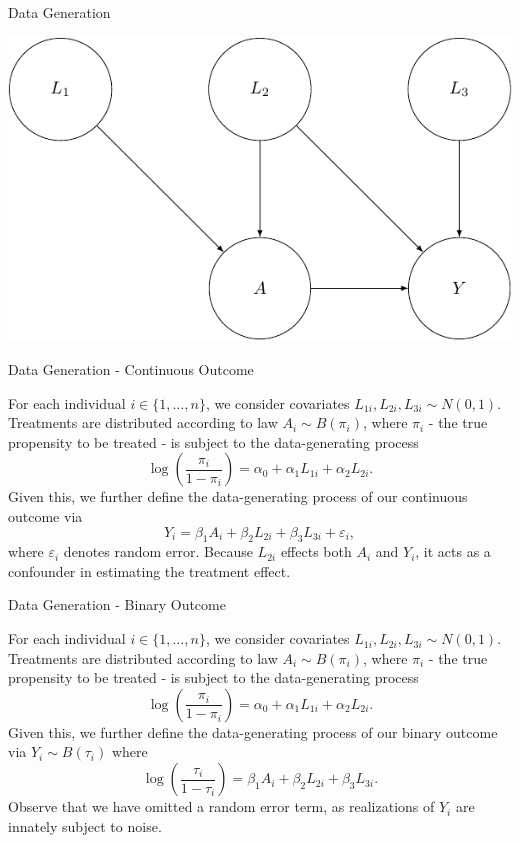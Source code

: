 \documentclass[
  ignorenonframetext,
]{beamer}
\begin{document}
\begin{frame}{Data Generation}
\protect\hypertarget{data-generation}{}

\includegraphics{pres_draft_jimmy_files/figure-beamer/unnamed-chunk-3-1.pdf}

\end{frame}

\begin{frame}{Data Generation - Continuous Outcome}
\protect\hypertarget{data-generation---continuous-outcome}{}

For each individual \(i \in \{ 1, \ldots, n \}\), we consider covariates
\(L_{1i}, L_{2i}, L_{3i} \sim N(0, 1)\). Treatments are distributed
according to law \(A_i \sim B(\pi_i)\), where \(\pi_i\) - the true
propensity to be treated - is subject to the data-generating process \[
    \log \left( \frac{\pi_i}{1 - \pi_i} \right)
    = \alpha_0 + \alpha_1 L_{1i} + \alpha_2 L_{2i}.
  \] Given this, we further define the data-generating process of our
continuous outcome via
\[ Y_i = \beta_1 A_i + \beta_2 L_{2i} + \beta_3 L_{3i} + \varepsilon_i, \]
where \(\varepsilon_i\) denotes random error. Because \(L_{2i}\) effects
both \(A_i\) and \(Y_i\), it acts as a confounder in estimating the
treatment effect.

\end{frame}

\begin{frame}{Data Generation - Binary Outcome}
\protect\hypertarget{data-generation---binary-outcome}{}

For each individual \(i \in \{ 1, \ldots, n \}\), we consider covariates
\(L_{1i}, L_{2i}, L_{3i} \sim N(0, 1)\). Treatments are distributed
according to law \(A_i \sim B(\pi_i)\), where \(\pi_i\) - the true
propensity to be treated - is subject to the data-generating process \[
    \log \left( \frac{\pi_i}{1 - \pi_i} \right)
    = \alpha_0 + \alpha_1 L_{1i} + \alpha_2 L_{2i}.
  \] Given this, we further define the data-generating process of our
binary outcome via \(Y_i \sim B(\tau_i)\) where \[
    \log \left( \frac{\tau_i}{1 - \tau_i} \right)
    = \beta_1 A_i + \beta_2 L_{2i} + \beta_3 L_{3i}.
  \] Observe that we have omitted a random error term, as realizations
of \(Y_i\) are innately subject to noise.

\end{frame}
\end{document}
